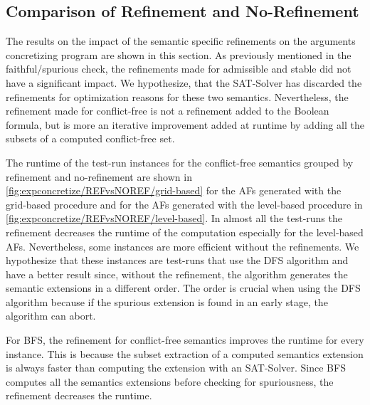 \subsection{Comparison of Refinement and No-Refinement}
\label{subsec:ComparisonOfRefinementAndNoRefinementOnConcretizingProgram}

The results on the impact of the semantic specific refinements on the arguments concretizing program are shown in this section. As previously mentioned in the faithful/spurious check, the refinements made for admissible and stable did not have a significant impact. We hypothesize, that the SAT-Solver has discarded the refinements for optimization reasons for these two semantics. Nevertheless, the refinement made for conflict-free is not a refinement added to the Boolean formula, but is more an iterative improvement added at runtime by adding all the subsets of a computed conflict-free set.

The runtime of the test-run instances for the conflict-free semantics grouped by refinement and no-refinement are shown in \cref{fig:expconcretize/REFvsNOREF/grid-based} for the AFs generated with the grid-based procedure and for the AFs generated with the level-based procedure in \cref{fig:expconcretize/REFvsNOREF/level-based}. In almost all the test-runs the refinement decreases the runtime of the computation especially for the level-based AFs. Nevertheless, some instances are more efficient without the refinements. We hypothesize that these instances are test-runs that use the DFS algorithm and have a better result since, without the refinement, the algorithm generates the semantic extensions in a different order. The order is crucial when using the DFS algorithm because if the spurious extension is found in an early stage, the algorithm can abort.

For BFS, the refinement for conflict-free semantics improves the runtime for every instance. This is because the subset extraction of a computed semantics extension is always faster than computing the extension with an SAT-Solver. Since BFS computes all the semantics extensions before checking for spuriousness, the refinement decreases the runtime.


